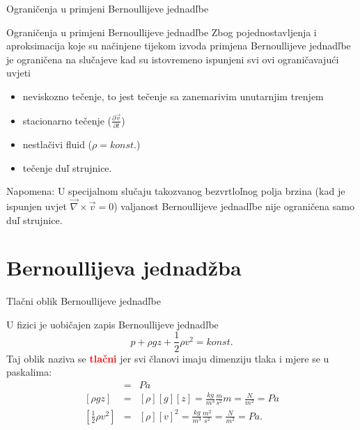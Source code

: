 \documentclass[croatian]{beamer}
\begin{document}
\begin{frame}{Ograničenja u primjeni Bernoullijeve jednadľbe}

\begin{alertblock}{Ograničenja u primjeni Bernoullijeve jednadľbe}
Zbog pojednostavljenja i aproksimacija koje su načinjene tijekom
izvoda primjena Bernoullijeve jednadľbe je ograničena na slučajeve
kad su istovremeno ispunjeni svi ovi ograničavajući uvjeti 

\begin{itemize}
\item neviskozno tečenje, to jest tečenje sa zanemarivim unutarnjim trenjem 
\item stacionarno tečenje ($\frac{\partial\vec{v}}{\partial t}$) 
\item nestlačivi fluid ($\rho=konst.$) 
\item tečenje duľ strujnice. 
\end{itemize}

\end{alertblock}
Napomena: U specijalnom slučaju takozvanog bezvrtloľnog polja brzina
(kad je ispunjen uvjet $\vec{\nabla}\times\vec{v}=0$) valjanost Bernoullijeve
jednadľbe nije ograničena samo duľ strujnice.
\end{frame}

\section{Bernoullijeva jednadžba}

\begin{frame}{Tlačni oblik Bernoullijeve jednadľbe}

U fizici je uobičajen zapis Bernoullijeve jednadľbe
\[
p+\rho gz+\frac{1}{2}\rho v^{2}=konst.
\]
Taj oblik naziva se \textbf{\textcolor{red}{tlačni}} jer svi članovi
imaju dimenziju tlaka i mjere se u paskalima:
\begin{eqnarray*}
[p] & = & Pa\\
{}[\rho gz] & = & [\rho][g][z]=\frac{kg}{m^{3}}\frac{m}{s^{2}}m=\frac{N}{m^{2}}=Pa\\
{}[\frac{1}{2}\rho v^{2}] & = & [\rho][v]^{2}=\frac{kg}{m^{3}}\frac{m^{2}}{s^{2}}=\frac{N}{m^{2}}=Pa.
\end{eqnarray*}
\end{frame}
\end{document}

